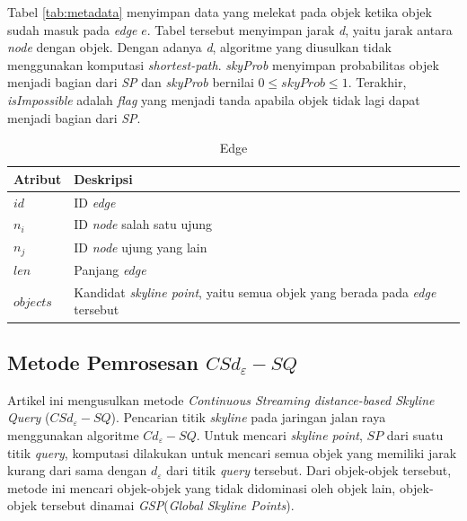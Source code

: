 \documentclass[conference]{IEEEtran}
\begin{document}
Tabel \ref{tab:metadata} menyimpan data yang melekat pada objek ketika objek sudah masuk pada  \textit{edge} $ e $. Tabel tersebut menyimpan jarak \textit{d}, yaitu jarak antara \textit{node} dengan objek. Dengan adanya \textit{d}, algoritme yang diusulkan tidak menggunakan komputasi \textit{shortest-path}. \textit{skyProb} menyimpan probabilitas objek menjadi bagian dari \textit{SP} dan \textit{skyProb} bernilai $ 0 \le skyProb \le 1 $. Terakhir, \textit{isImpossible} adalah \textit{flag} yang menjadi tanda apabila objek tidak lagi dapat menjadi bagian dari \textit{SP}.

\begin{table}[htbp]
	\caption{Edge}
	\begin{center}
		\begin{tabular}{| p{2cm} | p{5cm} |}
			\hline
			\textbf{Atribut} & \textbf{Deskripsi} \\ \hline
			$ id $ & ID \textit{edge} \\ \hline
			$ n_i $ & ID \textit{node} salah satu ujung \\ \hline
			$ n_j $ & ID \textit{node} ujung yang lain \\ \hline
			$ len $ & Panjang \textit{edge} \\ \hline
			$ objects $ & Kandidat \textit{skyline point}, yaitu semua objek yang berada pada \textit{edge} tersebut \\
			\hline
		\end{tabular}
		\label{tab:edge}
	\end{center}
\end{table}


\subsection{Metode Pemrosesan $ CSd_\varepsilon-SQ $}
Artikel ini mengusulkan metode \textit{Continuous Streaming distance-based Skyline Query} ($ CSd_\varepsilon-SQ $). Pencarian titik \textit{skyline} pada jaringan jalan raya menggunakan algoritme $ Cd_\varepsilon-SQ $\cite{continuousdbased}. Untuk mencari \textit{skyline point}, $ SP $ dari suatu titik \textit{query}, komputasi dilakukan untuk mencari semua objek yang memiliki jarak kurang dari sama dengan $ d_\varepsilon $ dari titik \textit{query} tersebut. Dari objek-objek tersebut, metode ini mencari objek-objek yang tidak didominasi oleh objek lain, objek-objek tersebut dinamai \textit{GSP}(\textit{Global Skyline Points}).
\end{document}
